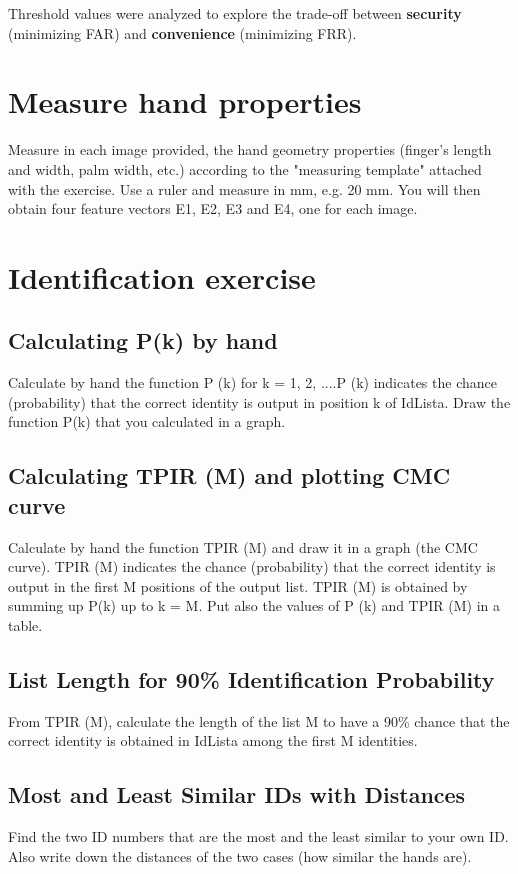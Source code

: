 \documentclass[a4paper,12pt]{article}
\begin{document}
\vspace{0.3em}
\noindent
Threshold values were analyzed to explore the trade-off between \textbf{security} (minimizing FAR) and \textbf{convenience} (minimizing FRR).

\newpage
\section{Measure hand properties}
Measure in each image provided, the hand geometry properties (finger’s length and width, palm width, etc.) according to the "measuring template" attached with the exercise. Use a ruler and measure in mm, e.g. 20 mm. You will then obtain four feature vectors E1, E2, E3 and E4, one for each image.


\section{Identification exercise}

\subsection{Calculating P(k) by hand}
Calculate by hand the function P (k) for k = 1, 2, ....P (k) indicates the chance (probability) that the correct identity is output in position k of IdLista. Draw the function P(k) that you calculated in a graph.

\subsection{Calculating TPIR (M) and plotting CMC curve}
Calculate by hand the function TPIR (M) and draw it in a graph (the CMC curve). 
TPIR (M) indicates the chance (probability) that the correct identity is output in the first M positions of the output list.  TPIR (M) is obtained by summing up P(k) up to k = M.
Put also the values of P (k) and TPIR (M) in a table.


\subsection{List Length for 90\% Identification Probability}
From TPIR (M), calculate the length of the list M to have a 90\% chance that the correct identity is obtained in IdLista among the first M identities.

\subsection{Most and Least Similar IDs with Distances}
Find the two ID numbers that are the most and the least similar to your own ID. Also write down the distances of the two cases (how similar the hands are).
\end{document}
